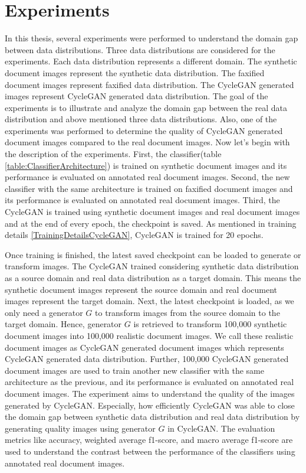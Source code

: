 \section{Experiments}\label{experiments}


In this thesis, several experiments were performed to understand the domain gap between data distributions. Three data distributions are considered for the experiments. Each data distribution represents a different domain. The synthetic document images represent the synthetic data distribution. The faxified document images represent faxified data distribution. The \ac{CycleGAN} generated images represent \ac{CycleGAN} generated data distribution. The goal of the experiments is to illustrate and analyze the domain gap between the real data distribution and above mentioned three data distributions. Also, one of the experiments was performed to determine the quality of \ac{CycleGAN} generated document images compared to the real document images. Now let's begin with the description of the experiments. First, the classifier(table \ref{table:ClassifierArchitecture}) is trained on synthetic document images and its performance is evaluated on annotated real document images. Second, the new classifier with the same architecture is trained on faxified document images and its performance is evaluated on annotated real document images. Third, the \ac{CycleGAN} is trained using synthetic document images and real document images and at the end of every epoch, the checkpoint is saved. As mentioned in training details \ref{TrainingDetailsCycleGAN}, \ac{CycleGAN} is trained for 20 epochs. 

Once training is finished, the latest saved checkpoint can be loaded to generate or transform images. The \ac{CycleGAN} trained considering synthetic data distribution as a source domain and real data distribution as a target domain. This means the synthetic document images represent the source domain and real document images represent the target domain. Next, the latest checkpoint is loaded, as we only need a generator $G$ to transform images from the source domain to the target domain. Hence, generator $G$ is retrieved to transform 100,000 synthetic document images into 100,000 realistic document images. We call these realistic document images as \ac{CycleGAN} generated document images which represents \ac{CycleGAN} generated data distribution. Further, 100,000 \ac{CycleGAN} generated document images are used to train another new classifier with the same architecture as the previous, and its performance is evaluated on annotated real document images. The experiment aims to understand the quality of the images generated by \ac{CycleGAN}. Especially, how efficiently \ac{CycleGAN} was able to close the domain gap between synthetic data distribution and real data distribution by generating quality images using generator $G$ in \ac{CycleGAN}. The evaluation metrics like accuracy, weighted average f1-score, and macro average f1-score \cite{lipton2014thresholding} are used to understand the contrast between the performance of the classifiers using annotated real document images.

